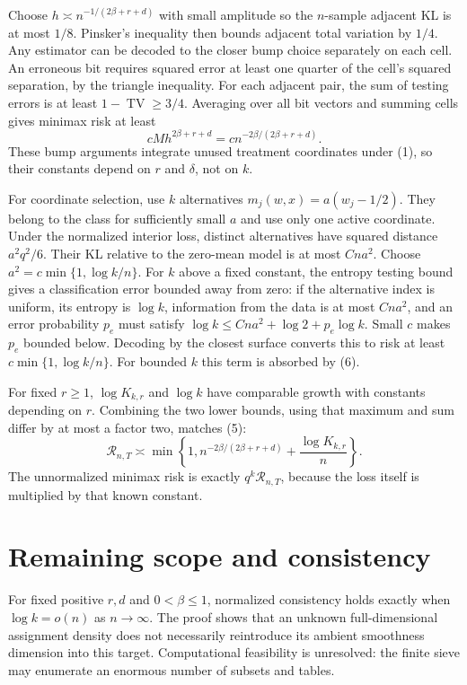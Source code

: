 \documentclass[11pt,a4paper]{article}
\begin{document}
Choose $h\asymp n^{-1/(2\beta+r+d)}$ with small amplitude so the $n$-sample adjacent KL is at most $1/8$. Pinsker's inequality then bounds adjacent total variation by $1/4$. Any estimator can be decoded to the closer bump choice separately on each cell. An erroneous bit requires squared error at least one quarter of the cell's squared separation, by the triangle inequality. For each adjacent pair, the sum of testing errors is at least $1-\operatorname{TV}\ge3/4$. Averaging over all bit vectors and summing cells gives minimax risk at least
\[
 cMh^{2\beta+r+d}=c n^{-2\beta/(2\beta+r+d)}. \tag{6}
\]
These bump arguments integrate unused treatment coordinates under (1), so their constants depend on $r$ and $\delta$, not on $k$.

For coordinate selection, use $k$ alternatives $m_j(w,x)=a(w_j-1/2)$. They belong to the class for sufficiently small $a$ and use only one active coordinate. Under the normalized interior loss, distinct alternatives have squared distance $a^2q^2/6$. Their KL relative to the zero-mean model is at most $Cna^2$. Choose $a^2=c\min\{1,\log k/n\}$. For $k$ above a fixed constant, the entropy testing bound gives a classification error bounded away from zero: if the alternative index is uniform, its entropy is $\log k$, information from the data is at most $Cna^2$, and an error probability $p_e$ must satisfy $\log k\le Cna^2+\log2+p_e\log k$. Small $c$ makes $p_e$ bounded below. Decoding by the closest surface converts this to risk at least $c\min\{1,\log k/n\}$. For bounded $k$ this term is absorbed by (6).

For fixed $r\ge1$, $\log K_{k,r}$ and $\log k$ have comparable growth with constants depending on $r$. Combining the two lower bounds, using that maximum and sum differ by at most a factor two, matches (5):
\[
 \mathcal R_{n,T}\asymp
 \min\left\{1, n^{-2\beta/(2\beta+r+d)}+
                          \frac{\log K_{k,r}}n\right\}. \tag{7}
\]
The unnormalized minimax risk is exactly $q^k\mathcal R_{n,T}$, because the loss itself is multiplied by that known constant.

\section{Remaining scope and consistency}
For fixed positive $r,d$ and $0<\beta\le1$, normalized consistency holds exactly when $\log k=o(n)$ as $n\to\infty$. The proof shows that an unknown full-dimensional assignment density does not necessarily reintroduce its ambient smoothness dimension into this target. Computational feasibility is unresolved: the finite sieve may enumerate an enormous number of subsets and tables.
\end{document}
